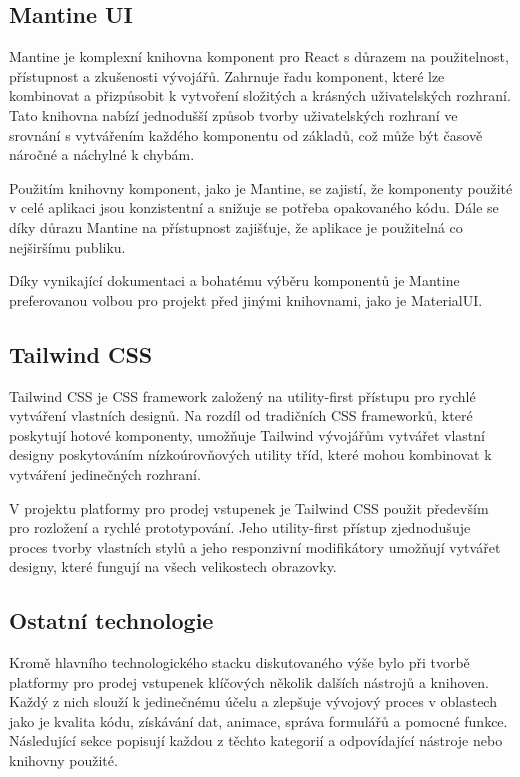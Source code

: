 \subsection{Mantine UI}
\label{sec:implementace-techologie-mantine}
Mantine je komplexní knihovna komponent pro React s důrazem na použitelnost, přístupnost a zkušenosti vývojářů.
Zahrnuje řadu komponent, které lze kombinovat a přizpůsobit k vytvoření složitých a krásných uživatelských rozhraní.
Tato knihovna nabízí jednodušší způsob tvorby uživatelských rozhraní ve srovnání s vytvářením každého komponentu od základů, což může být časově náročné a náchylné k chybám.

Použitím knihovny komponent, jako je Mantine, se zajistí, že komponenty použité v celé aplikaci jsou konzistentní a snižuje se potřeba opakovaného kódu.
Dále se díky důrazu Mantine na přístupnost zajišťuje, že aplikace je použitelná co nejširšímu publiku.

Díky vynikající dokumentaci a bohatému výběru komponentů je Mantine preferovanou volbou pro projekt před jinými knihovnami, jako je MaterialUI.

\subsection{Tailwind CSS}
\label{sec:implementace-techologie-tailwind}
Tailwind CSS je CSS framework založený na utility-first přístupu pro rychlé vytváření vlastních designů.
Na rozdíl od tradičních CSS frameworků, které poskytují hotové komponenty, umožňuje Tailwind vývojářům vytvářet vlastní designy poskytováním nízkoúrovňových utility tříd, které mohou kombinovat k vytváření jedinečných rozhraní.

V projektu platformy pro prodej vstupenek je Tailwind CSS použit především pro rozložení a rychlé prototypování.
Jeho utility-first přístup zjednodušuje proces tvorby vlastních stylů a jeho responzivní modifikátory umožňují vytvářet designy, které fungují na všech velikostech obrazovky.

\subsection{Ostatní technologie}
\label{sec:implementace-techologie-ostatni}
Kromě hlavního technologického stacku diskutovaného výše bylo při tvorbě platformy pro prodej vstupenek klíčových několik dalších nástrojů a knihoven.
Každý z nich slouží k jedinečnému účelu a zlepšuje vývojový proces v oblastech jako je kvalita kódu, získávání dat, animace, správa formulářů a pomocné funkce.
Následující sekce popisují každou z těchto kategorií a odpovídající nástroje nebo knihovny použité.

